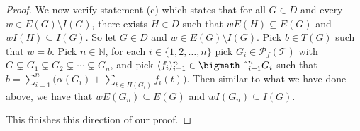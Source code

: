 \documentclass[12pt,showtrims]{memoir}
\theoremstyle{plain}
\theoremstyle{definition}
\newcommand{\la}{\langle}
\newcommand{\ra}{\rangle}
\newcommand{\bbN}{\mathbb{N}}
\newcommand{\calT}{\mathcal{T}}
\newcommand{\Pf}{\mathcal{P}_f}
\newcommand{\bigtimes}{\hbox{\bigmath \char'2}}
\begin{document}
\begin{proof}
  We now verify statement (c) which states that for all $G \in D$ and every $w \in E(G) \setminus I(G)$, there exists $H \in D$ such that $wE(H) \subseteq E(G)$ and $wI(H) \subseteq I(G)$.
  So let $G \in D$ and $w \in E(G) \setminus I(G)$. 
  Pick $b \in T(G)$ such that $w = \overline{b}$. 
  Pick $n \in \bbN$, for each $i \in \{1, 2, \ldots, n\}$ pick $G_i \in \Pf(\calT)$ with $G \subsetneq G_1 \subsetneq G_2 \subsetneq \cdots \subsetneq G_n$, and pick $\la f_i \ra_{i=1}^n \in \bigtimes_{i=1}^n G_i$ such that $b = \sum_{i=1}^n \bigl( \alpha(G_i) + \sum_{t \in H(G_i)} f_i(t)\bigr)$. 
  Then similar to what we have done above, we have that $wE(G_n) \subseteq E(G)$ and $wI(G_n) \subseteq I(G)$.

  This finishes this direction of our proof. 
\end{proof}





\end{document}
